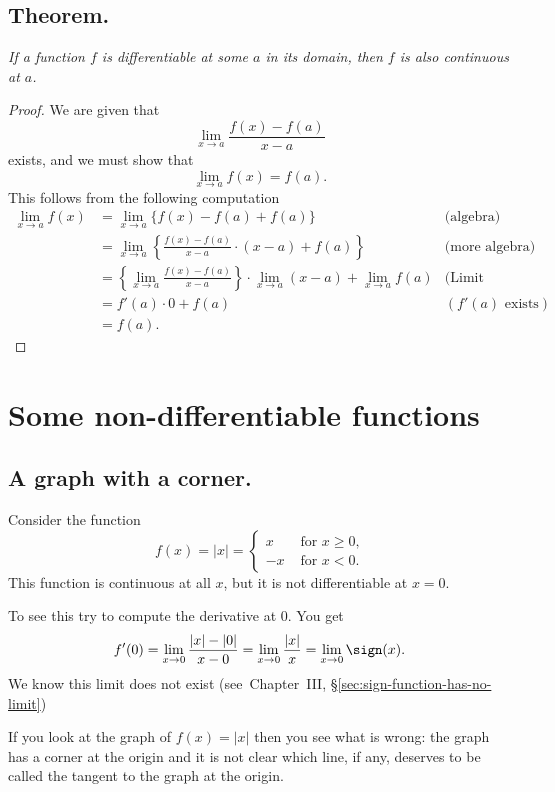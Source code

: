 \subsection{Theorem. }
\label{sec:04differentiable-implies-continuous}\itshape
If a function $f$ is differentiable at some $a$ in its domain,
then $f $ is also continuous at $a$.
\upshape

\begin{proof}
  We are given that
  \[
  \lim_{x\to a}\frac{f(x)-f(a)}{x-a}
  \]
  exists, and we must show that
  \[
  \lim_{x\to a} f(x) = f(a).
  \]
  This follows from the following computation
  \begin{align*}
    \lim_{x\to a}f(x) &= \lim_{x\to a} \bigl\{f(x)-f(a)+f(a) \bigr\}
    &\text{(algebra)}\\
    &= \lim_{x\to a} \left\{\frac{f(x)-f(a)}{x-a}\cdot(x-a) + f(a)\right\}
    &\text{(more algebra)}\\
    &= \left\{ \lim_{x\to a} \frac{f(x)-f(a)}{x-a}\right\} \cdot \lim_{x\to
    a}\left( x-a\right) + \lim_{x\to a} f(a)
    &\text{(Limit Properties)}\\[3pt]
    &= f'(a) \cdot 0 + f(a)
    &(f'(a) \text{ exists})\\[1ex]
    &= f(a).
  \end{align*}
\end{proof}

\section{Some non-differentiable functions}
\subsection{A graph with a corner. }
Consider the function 
\[
f(x) = |x| =
\begin{cases}
  x&\text{ for $x\geq0$,}\\
  -x & \text{ for $x<0$.}
\end{cases}
\]
This function is continuous at all $x$, but it is not differentiable at $x=0$.

To see this try to compute the derivative at 0.  You get
\[
f'(0) = \lim_{x\to 0} \frac{|x| - |0|}{x-0}
=\lim_{x\to 0} \frac{|x|}{x}
=\lim_{x\to 0} \sign(x).
\]
We know this limit does not exist (see~Chapter~III, \S\ref{sec:sign-function-has-no-limit})

If you look at the graph of $f(x) = |x|$ then you see what is wrong:
the graph has a corner at the origin and it is not clear which line,
if any, deserves to be called the tangent to the graph at the origin.


